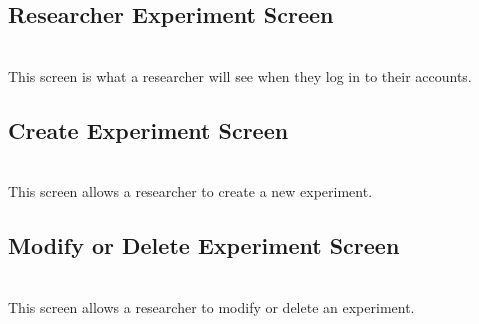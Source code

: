 \subsection{Researcher Experiment Screen}
\\
This screen is what a researcher will see when they log in to their accounts.

\subsection{Create Experiment Screen}
\\
This screen allows a researcher to create a new experiment.

\subsection{Modify or Delete Experiment Screen}
\\
This screen allows a researcher to modify or delete an experiment.
